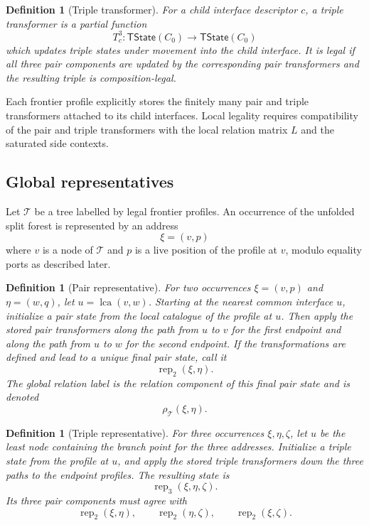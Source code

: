 \documentclass[11pt]{article}
\newtheorem{definition}[theorem]{Definition}
\newcommand{\lca}{\operatorname{lca}}
\begin{document}
\begin{definition}[Triple transformer]
For a child interface descriptor $c$, a triple transformer is a partial function
\[
  T^3_c:\mathsf{TState}(C_0)\to\mathsf{TState}(C_0)
\]
which updates triple states under movement into the child interface.  It is legal if all three pair components are updated by the corresponding pair transformers and the resulting triple is composition-legal.
\end{definition}

Each frontier profile explicitly stores the finitely many pair and triple transformers attached to its child interfaces.  Local legality requires compatibility of the pair and triple transformers with the local relation matrix $L$ and the saturated side contexts.

\subsection{Global representatives}

Let $\mathcal T$ be a tree labelled by legal frontier profiles.  An occurrence of the unfolded split forest is represented by an address
\[
  \xi=(v,p)
\]
where $v$ is a node of $\mathcal T$ and $p$ is a live position of the profile at $v$, modulo equality ports as described later.

\begin{definition}[Pair representative]
For two occurrences $\xi=(v,p)$ and $\eta=(w,q)$, let $u=\lca(v,w)$.  Starting at the nearest common interface $u$, initialize a pair state from the local catalogue of the profile at $u$.  Then apply the stored pair transformers along the path from $u$ to $v$ for the first endpoint and along the path from $u$ to $w$ for the second endpoint.  If the transformations are defined and lead to a unique final pair state, call it
\[
  \operatorname{rep}_2(\xi,\eta).
\]
The global relation label is the relation component of this final pair state and is denoted
\[
  \rho_\mathcal T(\xi,\eta).
\]
\end{definition}

\begin{definition}[Triple representative]
For three occurrences $\xi,\eta,\zeta$, let $u$ be the least node containing the branch point for the three addresses.  Initialize a triple state from the profile at $u$, and apply the stored triple transformers down the three paths to the endpoint profiles.  The resulting state is
\[
  \operatorname{rep}_3(\xi,\eta,\zeta).
\]
Its three pair components must agree with
\[
  \operatorname{rep}_2(\xi,\eta),\qquad
  \operatorname{rep}_2(\eta,\zeta),\qquad
  \operatorname{rep}_2(\xi,\zeta).
\]
\end{definition}
\end{document}
